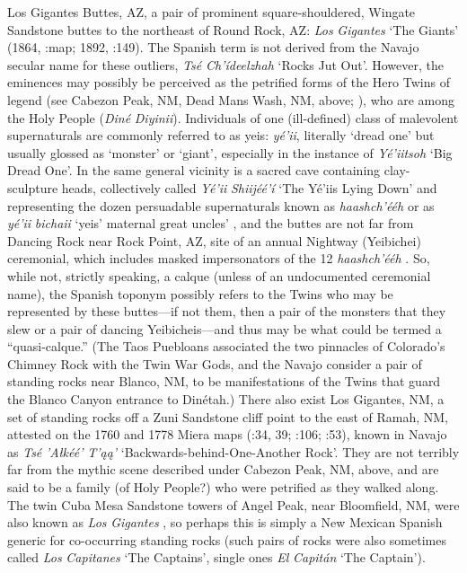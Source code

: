 Los Gigantes Buttes, AZ, a pair of prominent square-shouldered, Wingate Sandstone buttes to the northeast of Round Rock, AZ:  \textit{Los} \textit{Gigantes} ‘The Giants’ (1864, \citealt{Madsen2010}:map; 1892, \citealt{Eidenbach2012}:149).  The Spanish term is not derived from the Navajo secular name for these outliers, \textit{Tsé} \textit{Ch’ídeelzhah} ‘Rocks Jut Out’.  However, the eminences may possibly be perceived as the petrified forms of the Hero Twins of legend (see Cabezon Peak, NM, Dead Mans Wash, NM, above; \citealt{Jett1965}), who are among the Holy People (\textit{Diné} \textit{Diyinii}).  Individuals of one (ill-defined) class of malevolent supernaturals are commonly referred to as yeis: \textit{yé’ii}, literally ‘dread one’ but usually glossed as ‘monster’ or ‘giant’, especially in the instance of \textit{Yé’iitsoh} ‘Big Dread One’.  In the same general vicinity is a sacred cave containing clay-sculpture heads, collectively called \textit{Yé’ii} \textit{Shiijéé’í}  ‘The Yé’iis Lying Down’ and representing the dozen persuadable supernaturals known as \textit{haashch’ééh} or as \textit{yé’ii} \textit{bichaii} ‘yeis’ maternal great uncles’ \citep{Jett1982}, and the buttes are not far from Dancing Rock near Rock Point, AZ, site of an annual Nightway (Yeibichei) ceremonial, which includes masked impersonators of the 12 \textit{haashch’ééh} \citep{Matthews1902}.  So, while not, strictly speaking, a calque (unless of an undocumented ceremonial name), the Spanish toponym possibly refers to the Twins who may be represented by these buttes—if not them, then a pair of the monsters that they slew or a pair of dancing Yeibicheis—and thus may be what could be termed a “quasi-calque.”  (The Taos Puebloans associated the two pinnacles of Colorado’s Chimney Rock with the Twin War Gods, and the Navajo consider a pair of standing rocks near Blanco, NM, to be manifestations of the Twins that guard the Blanco Canyon entrance to Dinétah.)  There also exist Los Gigantes, NM, a set of standing rocks off a Zuni Sandstone cliff point to the east of Ramah, NM, attested on the 1760 and 1778 Miera maps (\citealt{Kessell2013}:34, 39; \citealt{Hodge1937}:106; \citealt{Eidenbach2012}:53), known in Navajo as \textit{Tsé} \textit{’Ałkéé’} \textit{T’ąą’} ‘Backwards-behind-One-Another Rock’.  They are not terribly far from the mythic scene described under Cabezon Peak, NM, above, and are said to be a family (of Holy People?) who were petrified as they walked along.  The twin Cuba Mesa Sandstone towers of Angel Peak, near Bloomfield, NM, were also known as \textit{Los} \textit{Gigantes} \citep[16]{Julyan1998}, so perhaps this is simply a New Mexican Spanish generic for co-occurring standing rocks (such pairs of rocks were also sometimes called \textit{Los} \textit{Capitanes} ‘The Captains’, single ones \textit{El} \textit{Capitán} ‘The Captain’).  

